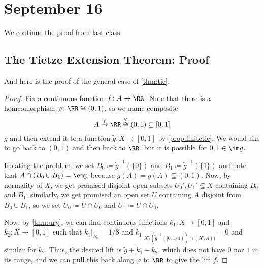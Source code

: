 \documentclass[../notes.tex]{subfiles}
\begin{document}
\section{September 16}

We continue the proof from last class.

\subsection{The Tietze Extension Theorem: Proof}
And here is the proof of the general case of \autoref{thm:tie}.
\tiethm*
\begin{proof}
	Fix a continuous function $f\colon A\to\RR$. Note that there is a homeomorphism $\varphi\colon\RR\cong(0,1)$, so we name composite
	\[A\stackrel f\to\RR\stackrel\varphi\cong(0,1)\subseteq[0,1]\]
	$g$ and then extend it to a function $\widetilde g\colon X\to[0,1]$ by \autoref{prop:finitetie}. We would like to go back to $(0,1)$ and then back to $\RR$, but it is possible for $0,1\in\im g$.

	Isolating the problem, we set $B_0\coloneqq\widetilde g^{-1}(\{0\})$ and $B_1\coloneqq\widetilde g^{-1}(\{1\})$ and note that $A\cap (B_0\cup B_1)=\emp$ because $\widetilde g(A)=g(A)\subseteq(0,1)$. Now, by normality of $X$, we get promised disjoint open subsets $U_0',U_1'\subseteq X$ containing $B_0$ and $B_1$; similarly, we get promised an open set $U$ containing $A$ disjoint from $B_0\cup B_1$, so we set $U_0\coloneqq U\cap U_0$ and $U_1\coloneqq U\cap U_0$.
	
	Now, by \autoref{thm:ury}, we can find continuous functions $k_1\colon X\to[0,1]$ and $k_2\colon X\to[0,1]$ such that $k_1|_{B_0}=1/8$ and $k_1|_{X\setminus(\widetilde g^{-1}([0,1/4))\cap(X\setminus A))}=0$ and similar for $k_2$. Thus, the desired lift is $\widetilde g+k_1-k_2$, which does not have $0$ nor $1$ in its range, and we can pull this back along $\varphi$ to $\RR$ to give the lift $\widetilde f$.
\end{proof}
\end{document}
